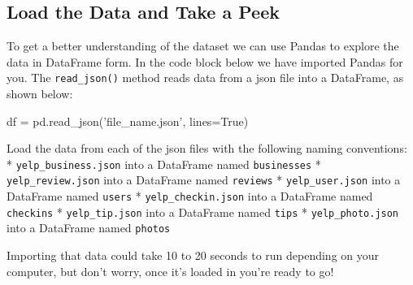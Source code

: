 \documentclass[11pt]{article}
\newenvironment{Shaded}{}{}
\newcommand{\StringTok}[1]{\textcolor[rgb]{0.25,0.44,0.63}{{#1}}}
\newcommand{\NormalTok}[1]{{#1}}
\newcommand{\VariableTok}[1]{\textcolor[rgb]{0.10,0.09,0.49}{{#1}}}
\newcommand{\OperatorTok}[1]{\textcolor[rgb]{0.40,0.40,0.40}{{#1}}}
\begin{document}
    \hypertarget{load-the-data-and-take-a-peek}{%
\subsection{Load the Data and Take a
Peek}\label{load-the-data-and-take-a-peek}}

To get a better understanding of the dataset we can use Pandas to
explore the data in DataFrame form. In the code block below we have
imported Pandas for you. The \texttt{read\_json()} method reads data
from a json file into a DataFrame, as shown below:

\begin{Shaded}
\begin{Highlighting}[]
\NormalTok{df }\OperatorTok{=}\NormalTok{ pd.read_json(}\StringTok{'file_name.json'}\NormalTok{, lines}\OperatorTok{=}\VariableTok{True}\NormalTok{)}
\end{Highlighting}
\end{Shaded}

Load the data from each of the json files with the following naming
conventions: * \texttt{yelp\_business.json} into a DataFrame named
\texttt{businesses} * \texttt{yelp\_review.json} into a DataFrame named
\texttt{reviews} * \texttt{yelp\_user.json} into a DataFrame named
\texttt{users} * \texttt{yelp\_checkin.json} into a DataFrame named
\texttt{checkins} * \texttt{yelp\_tip.json} into a DataFrame named
\texttt{tips} * \texttt{yelp\_photo.json} into a DataFrame named
\texttt{photos}

Importing that data could take 10 to 20 seconds to run depending on your
computer, but don't worry, once it's loaded in you're ready to go!
\end{document}
